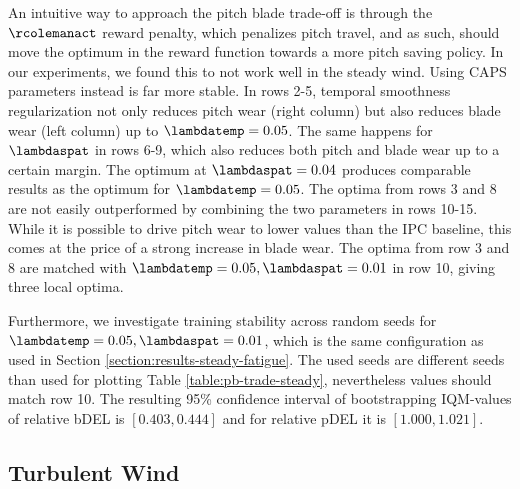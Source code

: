 An intuitive way to approach the pitch blade trade-off is through the $\rcolemanact$ reward penalty, which penalizes pitch travel, and as such, should move the optimum in the reward function towards a more pitch saving policy. In our experiments, we found this to not work well in the steady wind. Using \ac{CAPS} parameters instead is far more stable. In rows 2-5, temporal smoothness regularization not only reduces pitch wear (right column) but also reduces blade wear (left column) up to $\lambdatemp = 0.05$. The same happens for $\lambdaspat$ in rows 6-9, which also reduces both pitch and blade wear up to a certain margin. The optimum at $\lambdaspat=0.04$ produces comparable results as the optimum for $\lambdatemp = 0.05$. The optima from rows 3 and 8 are not easily outperformed by combining the two parameters in rows 10-15. While it is possible to drive pitch wear to lower values than the IPC baseline, this comes at the price of a strong increase in blade wear. The optima from row 3 and 8 are matched with $\lambdatemp=0.05, \lambdaspat=0.01$ in row 10, giving three local optima.

Furthermore, we investigate training stability across random seeds for $\lambdatemp=0.05, \lambdaspat=0.01$, which is the same configuration as used in Section \ref{section:results-steady-fatigue}. The used seeds are different seeds than used for plotting Table \ref{table:pb-trade-steady}, nevertheless values should match row 10. The resulting 95\% confidence interval of bootstrapping \ac{IQM}-values of relative bDEL is $[0.403, 0.444]$ and for relative pDEL it is $[1.000, 1.021]$.


\subsection{Turbulent Wind}


